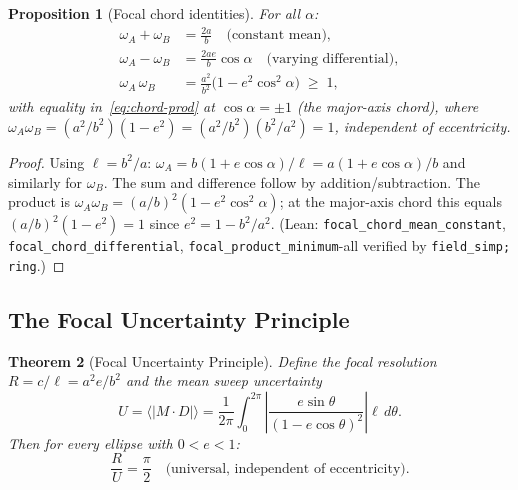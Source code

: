 \documentclass[12pt]{article}
\newtheorem{theorem}{Theorem}[section]
\newtheorem{proposition}[theorem]{Proposition}
\begin{document}
\begin{proposition}[Focal chord identities]\label{prop:focal-chord}
For all $\alpha$:
\begin{align}
\omega_A + \omega_B &= \frac{2a}{b} \quad\text{(constant mean)}, \label{eq:chord-sum}\\[4pt]
\omega_A - \omega_B &= \frac{2ae}{b}\cos\alpha \quad\text{(varying differential)}, \label{eq:chord-diff}\\[4pt]
\omega_A\,\omega_B &= \frac{a^2}{b^2}\bigl(1 - e^2\cos^2\!\alpha\bigr) \;\geq\; 1, \label{eq:chord-prod}
\end{align}
with equality in~\eqref{eq:chord-prod} at $\cos\alpha = \pm 1$ (the major-axis chord), where $\omega_A\omega_B = (a^2/b^2)(1-e^2) = (a^2/b^2)(b^2/a^2) = 1$, \emph{independent of eccentricity}.
\end{proposition}

\begin{proof}
Using $\ell = b^2/a$: $\omega_A = b(1+e\cos\alpha)/\ell = a(1+e\cos\alpha)/b$ and similarly for $\omega_B$. The sum and difference follow by addition/subtraction. The product is $\omega_A\omega_B = (a/b)^2(1 - e^2\cos^2\alpha)$; at the major-axis chord this equals $(a/b)^2(1-e^2) = 1$ since $e^2 = 1 - b^2/a^2$.
(Lean: \texttt{focal\_chord\_mean\_constant}, \texttt{focal\_chord\_differential}, \texttt{focal\_product\_minimum}-all verified by \texttt{field\_simp; ring}.)
\end{proof}

\subsection{The Focal Uncertainty Principle}

\begin{theorem}[Focal Uncertainty Principle]\label{thm:fup}
Define the \emph{focal resolution} $R = c/\ell = a^2 e/b^2$ and the \emph{mean sweep uncertainty}
\[
U = \langle|M\!\cdot\!D|\rangle = \frac{1}{2\pi}\int_0^{2\pi} \!\left|\frac{e\sin\theta}{(1-e\cos\theta)^2}\right|\ell\,d\theta.
\]
Then for every ellipse with $0 < e < 1$:
\begin{equation}\label{eq:fup}
\frac{R}{U} = \frac{\pi}{2} \quad\text{(universal, independent of eccentricity)}.
\end{equation}
\end{theorem}
\end{document}
